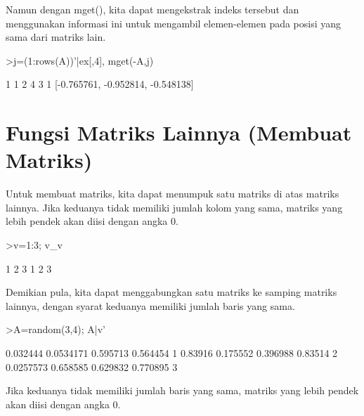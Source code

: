 \documentclass{article}
\newenvironment{eulernotebook}{\par}{\par}
\newcommand{\eulerheading}[1]{\section{#1}}
\newenvironment{eulercomment}{\par\medskip}{\par\medskip}
\begin{document}
\begin{eulernotebook}
\begin{eulercomment}
\begin{eulercomment}
\begin{eulercomment}
\begin{eulercomment}
\begin{eulercomment}
Namun dengan mget(), kita dapat mengekstrak indeks tersebut dan
menggunakan informasi ini untuk mengambil elemen-elemen pada posisi
yang sama dari matriks lain.
\end{eulercomment}
\begin{eulerprompt}
>j=(1:rows(A))'|ex[,4], mget(-A,j)
\end{eulerprompt}
\begin{euleroutput}
              1             1 
              2             4 
              3             1 
  [-0.765761,  -0.952814,  -0.548138]
\end{euleroutput}
\begin{eulercomment}
\begin{eulercomment}
\eulerheading{Fungsi Matriks Lainnya (Membuat Matriks)}
\begin{eulercomment}
Untuk membuat matriks, kita dapat menumpuk satu matriks di atas
matriks lainnya. Jika keduanya tidak memiliki jumlah kolom yang sama,
matriks yang lebih pendek akan diisi dengan angka 0.
\end{eulercomment}
\begin{eulerprompt}
>v=1:3; v_v
\end{eulerprompt}
\begin{euleroutput}
              1             2             3 
              1             2             3 
\end{euleroutput}
\begin{eulercomment}
Demikian pula, kita dapat menggabungkan satu matriks ke samping
matriks lainnya, dengan syarat keduanya memiliki jumlah baris yang
sama.
\end{eulercomment}
\begin{eulerprompt}
>A=random(3,4); A|v'
\end{eulerprompt}
\begin{euleroutput}
       0.032444     0.0534171      0.595713      0.564454             1 
        0.83916      0.175552      0.396988       0.83514             2 
      0.0257573      0.658585      0.629832      0.770895             3 
\end{euleroutput}
\begin{eulercomment}
Jika keduanya tidak memiliki jumlah baris yang sama, matriks yang
lebih pendek akan diisi dengan angka 0.


\end{eulercomment}
\end{eulercomment}
\end{eulercomment}
\end{eulercomment}
\end{eulercomment}
\end{eulercomment}
\end{eulercomment}
\end{eulernotebook}
\end{document}
